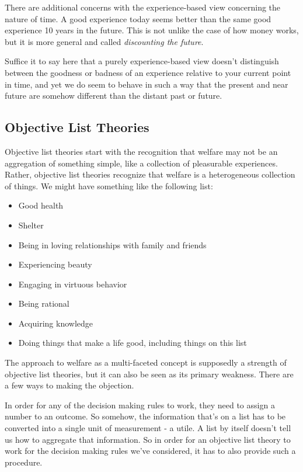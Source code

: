 \documentclass[]{tufte-book}
\providecommand{\tightlist}{%
  \setlength{\itemsep}{0pt}\setlength{\parskip}{0pt}}
\begin{document}
There are additional concerns with the experience-based view concerning the nature of time. A good experience today seems better than the same good experience 10 years in the future. This is not unlike the case of how money works, but it is more general and called \emph{discounting the future}.

Suffice it to say here that a purely experience-based view doesn't distinguish between the goodness or badness of an experience relative to your current point in time, and yet we do seem to behave in such a way that the present and near future are somehow different than the distant past or future.

\hypertarget{objective-list-theories}{%
\subsection{Objective List Theories}\label{objective-list-theories}}

Objective list theories start with the recognition that welfare may not be an aggregation of something simple, like a collection of pleasurable experiences. Rather, objective list theories recognize that welfare is a heterogeneous collection of things. We might have something like the following list:

\begin{itemize}
\tightlist
\item
  Good health
\item
  Shelter
\item
  Being in loving relationships with family and friends
\item
  Experiencing beauty
\item
  Engaging in virtuous behavior
\item
  Being rational
\item
  Acquiring knowledge
\item
  Doing things that make a life good, including things on this list
\end{itemize}

The approach to welfare as a multi-faceted concept is supposedly a strength of objective list theories, but it can also be seen as its primary weakness. There are a few ways to making the objection.

In order for any of the decision making rules to work, they need to assign a number to an outcome. So somehow, the information that's on a list has to be converted into a single unit of measurement - a utile. A list by itself doesn't tell us how to aggregate that information. So in order for an objective list theory to work for the decision making rules we've considered, it has to also provide such a procedure.
\end{document}
